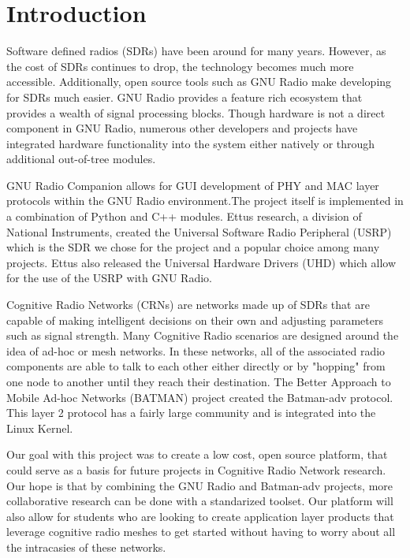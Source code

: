 \section{Introduction}

Software defined radios (SDRs) have been around for many years. However, as the cost of SDRs
continues to drop, the technology becomes much more accessible. Additionally, open source
tools such as GNU Radio make developing for SDRs much easier. GNU Radio provides a feature rich
ecosystem that provides a wealth of signal processing blocks. Though hardware is not a direct
component in GNU Radio, numerous other developers and projects have integrated hardware functionality
into the system either natively or through additional out-of-tree modules.

GNU Radio Companion allows for GUI development of PHY and MAC layer protocols within the
GNU Radio environment.The project itself is implemented in a combination of Python and C++ modules. 
Ettus research, a division of National Instruments, created the Universal Software Radio Peripheral 
(USRP) which is the SDR we chose for the project and a popular choice among many projects.
Ettus also released the Universal Hardware Drivers (UHD) which allow for the use of the USRP with GNU Radio.   

Cognitive Radio Networks (CRNs) are networks made up of SDRs that are capable of making 
intelligent decisions on their own and adjusting parameters such as signal strength. 
Many Cognitive Radio scenarios are designed around the idea of ad-hoc or mesh
networks. In these networks, all of the associated radio components are able to talk to each
other either directly or by "hopping" from one node to another until they reach their destination. 
The Better Approach to Mobile Ad-hoc Networks (BATMAN) project created the Batman-adv protocol. 
This layer 2 protocol has a fairly large community and is integrated into the Linux Kernel. 

Our goal with this project was to create a low cost, open source platform, that could serve as a
basis for future projects in Cognitive Radio Network research. Our hope is that by combining the GNU
Radio and Batman-adv projects, more collaborative research can be done with a standarized toolset. 
Our platform will also allow for students who are looking to create application layer products that 
leverage cognitive radio meshes to get started without having to worry about all the intracasies of
these networks. 
